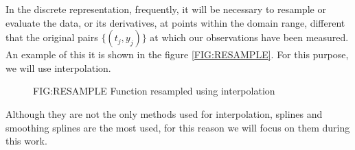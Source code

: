 
In the discrete representation, frequently, it will be necessary to resample or
evaluate the data, or its derivatives, at points within the domain range,
different that the original pairs $\{(t_j, y_j)\}$ at which our observations
have been measured. An example of this it is shown in the figure
\ref{FIG:RESAMPLE}. For this purpose, we will use interpolation.

\begin{figure}[Function resampled using interpolation]{FIG:RESAMPLE}
  {Function resampled using interpolation}
  
   \quad
\end{figure}

Although they are not the only methods used for interpolation, splines and
smoothing splines are the most used, for this reason we will focus on them
during this work.
